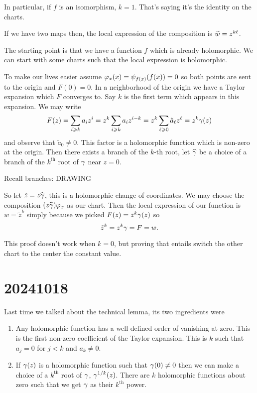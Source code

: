 \documentclass[12pt]{memoir}
\begin{document}
\begin{Rmk}
    In particular, if $f$ is an isomorphism, $k=1$. That's saying it's the identity on the charts.\par
    If we have two maps then, the local expression of the composition is $\widetilde{w}=z^{k\ell}$.
\end{Rmk}

The starting point is that we have a function $f$ which is already holomorphic. We can start with some charts such that the local expression is holomorphic.\par
To make our lives easier assume $\varphi_x(x)=\psi_{f(x)}(f(x))=0$ so both points are sent to the origin and $F(0)=0$. In a neighborhood of the origin we have a Taylor expansion which $F$ converges to. Say $k$ is the first term which appears in this expansion. We may write 
$$F(z)=\sum_{i\geqslant k}a_iz^i=z^k\sum_{i\geqslant k}a_iz^{i-k}=z^k\sum_{\ell\geqslant 0}\tilde{a}_\ell z^\ell=z^k\gamma(z)$$
and observe that $\tilde{a}_0\neq 0$. This factor is a holomorphic function which is non-zero at the origin. Then there exists a branch of the $k$-th root, let $\widehat{\gamma}$ be a choice of a branch of the $k^{\text{th}}$ root of $\gamma$ near $z=0$.

\begin{Rmk}
    Recall branches: DRAWING
\end{Rmk}

So let $\tilde{z}=z\widehat{\gamma}$, this is a holomorphic change of coordinates. We may choose the composition $(z\widehat{\gamma})\varphi_x$ as our chart. Then the local expression of our function is $w=\tilde{z}^k$ simply because we picked $F(z)=z^k\gamma(z)$ so 
$$\tilde{z}^k=z^k\gamma=F=w.$$
\begin{Rmk}
    This proof doesn't work when $k=0$, but proving that entails switch the other chart to the center the constant value.
\end{Rmk}

\section{20241018}

Last time we talked about the technical lemma, its two ingredients were
\begin{enumerate}
    \item Any holomorphic function has a well defined order of vanishing at zero. This is the first non-zero coefficient of the Taylor expansion. This is $k$ such that $a_j=0$ for $j<k$ and $a_k\neq 0$.
    \item If $\gamma(z)$ is a holomorphic function such that $\gamma(0)\neq 0$ then we can make a choice of a $k^{\text{th}}$ root of $\gamma$, $\gamma^{1/k}(z)$. There are $k$ holomorphic functions about zero such that we get $\gamma$ as their $k^{\text{th}}$ power.
\end{enumerate}
\end{document}
